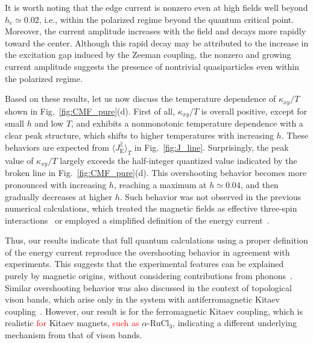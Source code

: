 \documentclass[twocolumn,superscriptaddress,showpacs, longbibliography, aps, prx]{revtex4-2}
\newcommand{\red}[1]{\textcolor{red}{#1}}
\begin{document}
It is worth noting that the edge current is nonzero even at high fields well beyond $h_c \simeq 0.02$, i.e., within the polarized regime beyond the quantum critical point. 
Moreover, the current amplitude increases with the field and decays more rapidly toward the center. 
Although this rapid decay may be attributed to the increase in the excitation gap induced by the Zeeman coupling, the nonzero and growing current amplitude suggests the presence of nontrivial quasiparticles even within the polarized regime.

Based on these results, let us now discuss the temperature dependence of $\kappa_{xy}/T$ shown in Fig.~\ref{fig:CMF_pure}(d). First of all, $\kappa_{xy}/T$ is overall positive, except for small $h$ and low $T$, and exhibits a nonmonotonic temperature dependence with a clear peak structure, which shifts to higher temperatures with increasing $h$. 
These behaviors are expected from $\langle J_{\mathrm{E}}^\parallel \rangle_T$ in Fig.~\ref{fig:J_line}. 
Surprisingly, the peak value of $\kappa_{xy}/T$ largely exceeds the half-integer quantized value indicated by the broken line in Fig.~\ref{fig:CMF_pure}(d). 
This overshooting behavior becomes more pronounced with increasing $h$, reaching a maximum at $h\simeq 0.04$, and then gradually decreases at higher $h$. 
Such behavior was not observed in the previous numerical calculations, which treated the magnetic fields as effective three-spin interactions~\cite{NasuYM2017} or employed a simplified definition of the energy current~\cite{KumarT2023}. 

Thus, our results indicate that full quantum calculations using a proper definition of the energy current reproduce the overshooting behavior in agreement with experiments. 
This suggests that the experimental features can be explained purely by magnetic origins, without considering contributions from phonons~\cite{Ye2018Quantization,Vinkler2018}. 
Similar overshooting behavior was also discussed in the context of topological vison bands, which arise only in the system with antiferromagnetic Kitaev coupling~\cite{Joy2022}. 
However, our result is for the ferromagnetic Kitaev coupling, which is realistic %
\red{for} Kitaev magnets, %
\red{such as} $\alpha$-RuCl$_3$, indicating a different underlying mechanism from that of vison bands. 
\end{document}
